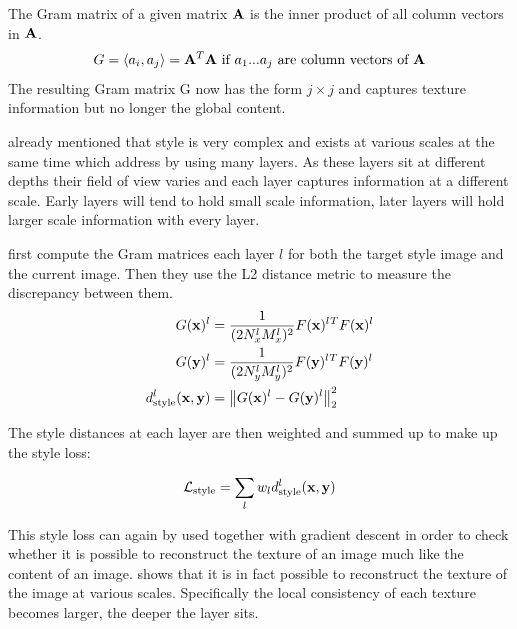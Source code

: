 The Gram matrix of a given matrix $\mathbf{A}$ is the inner product of all column vectors in $\mathbf{A}$.
\begin{align}
    G = \langle a_{i}, a_{j} \rangle = \mathbf{A}^T \mathbf{A} \text{ if $a_1$...$a_j$ are column vectors of $\mathbf{A}$}
\end{align}
The resulting Gram matrix G now has the form $j \times j$ and captures texture information but no longer the global content.

 already mentioned that style is very complex and exists at various scales at the same time which \citeauthor*{gatys} address by using many layers.
As these layers sit at different depths their field of view varies and each layer captures information at a different scale.
Early layers will tend to hold small scale information, later layers will hold larger scale information with every layer.

\citeauthor*{gatys} first compute the Gram matrices each layer $l$ for both the target style image and the current image.
Then they use the L2 distance metric to measure the discrepancy between them.
\begin{align}
    G(\mathbf{x})^l & = \frac{1}{(2 N_x^l M_x^l)^2} F(\mathbf{x})^l{}^T F(\mathbf{x})^l \\
    G(\mathbf{y})^l & = \frac{1}{(2 N_y^l M_y^l)^2} F(\mathbf{y})^l{}^T F(\mathbf{y})^l \\
    d_{\text{style}}^l(\mathbf{x}, \mathbf{y}) & = \left\lVert G(\mathbf{x})^l - G(\mathbf{y})^l\right\rVert^2_2 \\
\end{align}


The style distances at each layer are then weighted and summed up to make up the style loss:

\begin{align}
    \mathcal{L}_{\text{style}} = \sum_{l} w_l d_{\text{style}}^l(\mathbf{x}, \mathbf{y})
\end{align}

This style loss can again by used together with gradient descent in order to check whether it is possible to reconstruct the texture of an image much like the content of an image.
 shows that it is in fact possible to reconstruct the texture of the image at various scales.
Specifically the local consistency of each texture becomes larger, the deeper the layer sits.

